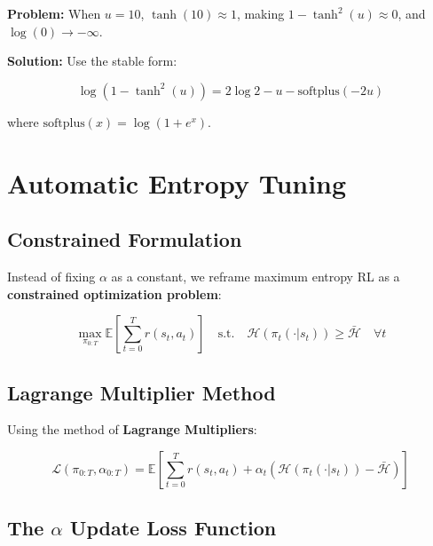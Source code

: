 \documentclass[12pt,a4paper]{article}
\theoremstyle{noteplain}
\theoremstyle{noteexercise}
\begin{document}
\textbf{Problem:} When $u = 10$, $\tanh(10) \approx 1$, making $1 - \tanh^2(u) \approx 0$, and $\log(0) \to -\infty$.

\textbf{Solution:} Use the stable form:

\begin{equation}\label{eq:stable-tanh}
\boxed{\log(1 - \tanh^2(u)) = 2\log2 - u - \text{softplus}(-2u)}
\end{equation}

where $\text{softplus}(x) = \log(1 + e^x)$.






\section{Automatic Entropy Tuning}\label{sec:auto-entropy}



\subsection{Constrained Formulation}\label{ssec:constrained}



Instead of fixing $\alpha$ as a constant, we reframe maximum entropy RL as a \textbf{constrained optimization problem}:

$$\max_{\pi_{0:T}} \mathbb{E}\left[\sum_{t=0}^{T} r(s_t, a_t)\right] \quad \text{s.t.} \quad \mathcal{H}(\pi_t(\cdot|s_t)) \geq \bar{\mathcal{H}} \quad \forall t$$



\subsection{Lagrange Multiplier Method}\label{ssec:lagrange}



Using the method of \textbf{Lagrange Multipliers}:

$$\mathcal{L}(\pi_{0:T}, \alpha_{0:T}) = \mathbb{E}\left[\sum_{t=0}^{T} r(s_t, a_t) + \alpha_t(\mathcal{H}(\pi_t(\cdot|s_t)) - \bar{\mathcal{H}})\right]$$



\subsection{The $\alpha$ Update Loss Function}\label{ssec:alpha-loss}
\end{document}

